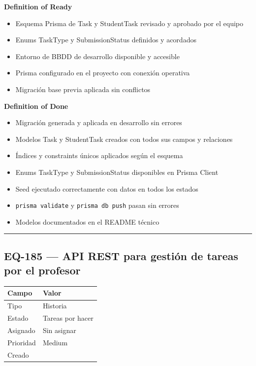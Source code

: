 \documentclass[
  spanish,
  11pt,
]{report}
\newcounter{none} %
\providecommand{\tightlist}{%
  \setlength{\itemsep}{0pt}\setlength{\parskip}{0pt}}
\begin{document}
\textbf{Definition of Ready}

\begin{itemize}
\tightlist
\item
  Esquema Prisma de Task y StudentTask revisado y aprobado por el equipo
\item
  Enums TaskType y SubmissionStatus definidos y acordados
\item
  Entorno de BBDD de desarrollo disponible y accesible
\item
  Prisma configurado en el proyecto con conexión operativa
\item
  Migración base previa aplicada sin conflictos
\end{itemize}

\textbf{Definition of Done}

\begin{itemize}
\tightlist
\item
  Migración generada y aplicada en desarrollo sin errores
\item
  Modelos Task y StudentTask creados con todos sus campos y relaciones
\item
  Índices y constraints únicos aplicados según el esquema
\item
  Enums TaskType y SubmissionStatus disponibles en Prisma Client
\item
  Seed ejecutado correctamente con datos en todos los estados
\item
  \texttt{prisma\ validate} y \texttt{prisma\ db\ push} pasan sin
  errores
\item
  Modelos documentados en el README técnico
\end{itemize}

\begin{center}\rule{0.5\linewidth}{0.5pt}\end{center}

\subsection{EQ-185 --- API REST para gestión de tareas por el
profesor}\label{eq-185-api-rest-para-gestiuxf3n-de-tareas-por-el-profesor}

{\def\LTcaptype{none} %
\begin{longtable}[]{@{}ll@{}}
\toprule\noalign{}
Campo & Valor \\
\midrule\noalign{}
\endhead
\bottomrule\noalign{}
\endlastfoot
Tipo & Historia \\
Estado & Tareas por hacer \\
Asignado & Sin asignar \\
Prioridad & Medium \\
Creado & \\
\end{longtable}
}
\end{document}
